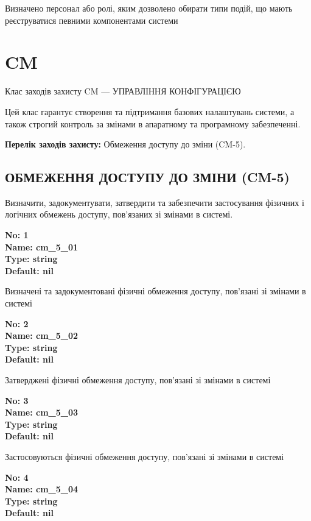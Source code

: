 \documentclass{article}
\begin{document}
{\footnotesize Визначено персонал або ролі, яким дозволено обирати типи подій, що мають реєструватися певними компонентами системи}




\section{CM}
Клас заходів захисту CM --- УПРАВЛІННЯ КОНФІГУРАЦІЄЮ

Цей клас гарантує створення та підтримання базових налаштувань системи, а також строгий контроль за змінами в апаратному та програмному забезпеченні.

\textbf{Перелік заходів захисту:} Обмеження доступу до зміни (CM-5).

\subsection{ОБМЕЖЕННЯ ДОСТУПУ ДО ЗМІНИ (CM-5)}
Визначити, задокументувати, затвердити та забезпечити застосування фізичних і логічних обмежень доступу, пов'язаних зі змінами в системі.

\vspace{10pt}
{\footnotesize\bfseries
No: 1\\
Name: cm\_\allowbreak{}5\_\allowbreak{}01\\
Type: string\\
Default: nil
}

{\footnotesize Визначені та задокументовані фізичні обмеження доступу, пов'язані зі змінами в системі}


{\footnotesize\bfseries
No: 2\\
Name: cm\_\allowbreak{}5\_\allowbreak{}02\\
Type: string\\
Default: nil
}

{\footnotesize Затверджені фізичні обмеження доступу, пов'язані зі змінами в системі}


{\footnotesize\bfseries
No: 3\\
Name: cm\_\allowbreak{}5\_\allowbreak{}03\\
Type: string\\
Default: nil
}

{\footnotesize Застосовуються фізичні обмеження доступу, пов'язані зі змінами в системі}


{\footnotesize\bfseries
No: 4\\
Name: cm\_\allowbreak{}5\_\allowbreak{}04\\
Type: string\\
Default: nil
}
\end{document}
